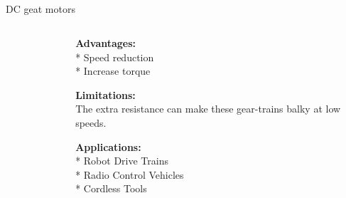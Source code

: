 \subsection{}
{
\begin{frame}{DC geat motors}

\begin{columns}
\begin{column}{0.6\textwidth}  %

	\vspace{-3mm}
   	\begin{figure}
 	\end{figure}

\end{column}

\begin{column}{0.4\textwidth}

{\bf Advantages:} \\
* Speed reduction \\
* Increase torque

{\bf Limitations:} \\
The extra resistance can make these gear-trains balky at low speeds.

{\bf Applications:} \\
* Robot Drive Trains \\
* Radio Control Vehicles \\
* Cordless Tools



\end{column}
\end{columns}
\end{frame}
}




